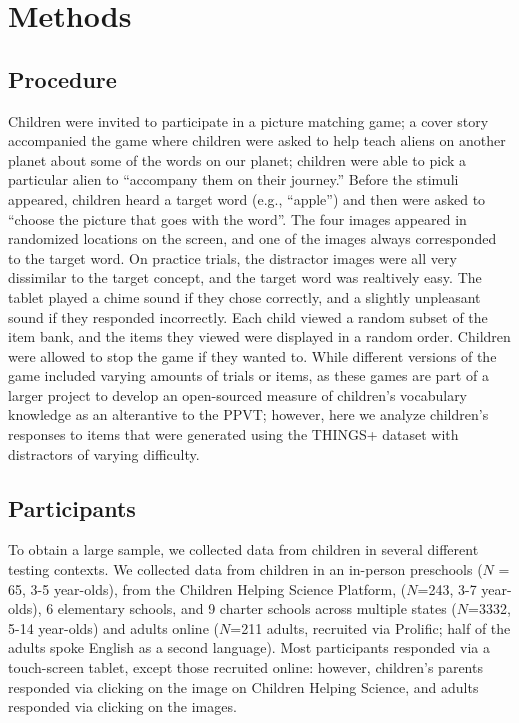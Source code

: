 \documentclass[
  man]{apa6}
\begin{document}
\section{Methods}\label{methods}

\subsection{Procedure}\label{procedure}

Children were invited to participate in a picture matching game; a cover story accompanied the game where children were asked to help teach aliens on another planet about some of the words on our planet; children were able to pick a particular alien to ``accompany them on their journey.'' Before the stimuli appeared, children heard a target word (e.g., ``apple'') and then were asked to ``choose the picture that goes with the word''. The four images appeared in randomized locations on the screen, and one of the images always corresponded to the target word. On practice trials, the distractor images were all very dissimilar to the target concept, and the target word was realtively easy. The tablet played a chime sound if they chose correctly, and a slightly unpleasant sound if they responded incorrectly. Each child viewed a random subset of the item bank, and the items they viewed were displayed in a random order. Children were allowed to stop the game if they wanted to. While different versions of the game included varying amounts of trials or items, as these games are part of a larger project to develop an open-sourced measure of children's vocabulary knowledge as an alterantive to the PPVT; however, here we analyze children's responses to items that were generated using the THINGS+ dataset with distractors of varying difficulty.

\subsection{Participants}\label{participants}

To obtain a large sample, we collected data from children in several different testing contexts. We collected data from children in an in-person preschools (\(N\) = 65, 3-5 year-olds), from the Children Helping Science Platform, (\(N\)=243, 3-7 year-olds), 6 elementary schools, and 9 charter schools across multiple states (\(N\)=3332, 5-14 year-olds) and adults online (\(N\)=211 adults, recruited via Prolific; half of the adults spoke English as a second language). Most participants responded via a touch-screen tablet, except those recruited online: however, children's parents responded via clicking on the image on Children Helping Science, and adults responded via clicking on the images.
\end{document}
